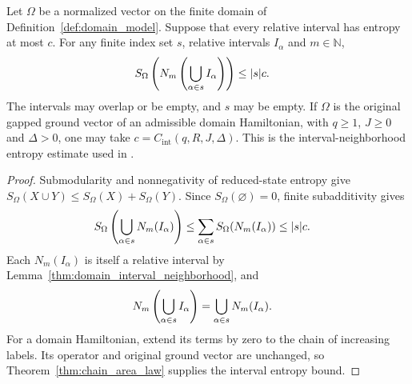 \begin{lemma}
    \label{thm:domain_interval_neighborhood_entropy}
    \leanok
    Let $\Omega$ be a normalized vector on the finite domain of
    Definition~\ref{def:domain_model}. Suppose that every relative interval has
    entropy at most $c$. For any finite index set $s$, relative intervals
    $I_\alpha$ and $m\in\mathbb N$,
    \begin{align}
        S_\Omega\left(N_m\left(\bigcup_{\alpha\in s}I_\alpha\right)\right)
         & \le |s|c.\notag
    \end{align}
    The intervals may overlap or be empty, and $s$ may be empty.
    If $\Omega$ is the original gapped ground vector of an admissible domain
    Hamiltonian, with $q\ge1$, $J\ge0$ and $\Delta>0$, one may take
    $c=C_{\mathrm{int}}(q,R,J,\Delta)$.
    This is the interval-neighborhood entropy estimate used in
    \cite[Part~IIa]{TNLean2026OneDimensional}.
\end{lemma}
\begin{proof}\leanok
    Submodularity and nonnegativity of reduced-state entropy give
    $S_\Omega(X\cup Y)\le S_\Omega(X)+S_\Omega(Y)$.
    Since $S_\Omega(\varnothing)=0$, finite subadditivity gives
    \begin{align}
        S_\Omega\left(\bigcup_{\alpha\in s}N_m(I_\alpha)\right)
         & \le\sum_{\alpha\in s}S_\Omega(N_m(I_\alpha))\le |s|c.\notag
    \end{align}
    Each $N_m(I_\alpha)$ is itself a relative interval by
    Lemma~\ref{thm:domain_interval_neighborhood}, and
    \begin{align}
        N_m\left(\bigcup_{\alpha\in s}I_\alpha\right)
         & =\bigcup_{\alpha\in s}N_m(I_\alpha).\notag
    \end{align}
    For a domain Hamiltonian, extend its terms by zero to the
    chain of increasing labels. Its operator and original ground vector
    are unchanged, so Theorem~\ref{thm:chain_area_law} supplies the interval
    entropy bound.
\end{proof}

